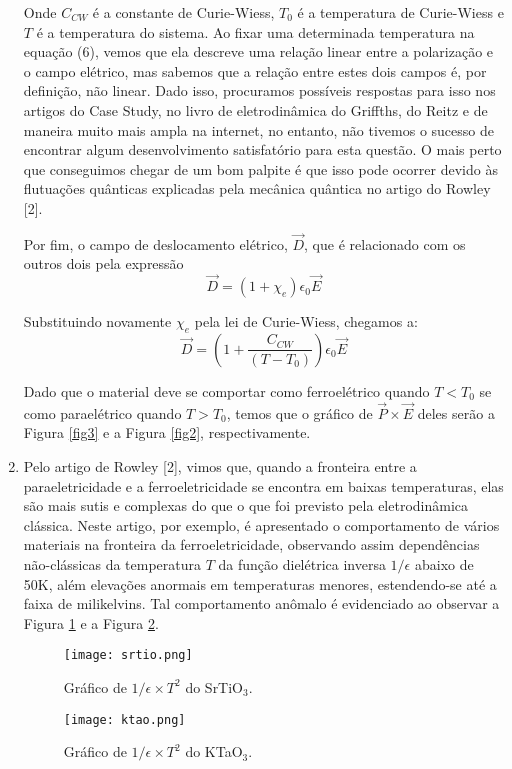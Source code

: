 \documentclass[a4paper,12pt]{article}
\newcommand{\eq}{\begin{equation}}
\newcommand{\feq}{\end{equation}}
\begin{document}
\begin{enumerate}
Onde $C_{CW}$ é a constante de Curie-Wiess, $T_0$ é a temperatura de Curie-Wiess e $T$ é a temperatura do sistema. Ao fixar uma determinada temperatura na equação (6), vemos que ela descreve uma relação linear entre a polarização e o campo elétrico, mas sabemos que a relação entre estes dois campos é, por definição, não linear. Dado isso, procuramos possíveis respostas para isso nos artigos do Case Study, no livro de eletrodinâmica do Griffths, do Reitz e de maneira muito mais ampla na internet, no entanto, não tivemos o sucesso de encontrar algum desenvolvimento satisfatório para esta questão. O mais perto que conseguimos chegar de um bom palpite é que isso pode ocorrer devido às flutuações quânticas explicadas pela mecânica quântica no artigo do Rowley [2].

Por fim, o campo de deslocamento elétrico, $\vec{D}$, que é relacionado com os outros dois pela expressão \eq\vec{D} = \left ( 1+ \chi_e \right ) \epsilon_0 \vec{E}\feq

Substituindo novamente $\chi_e$ pela lei de Curie-Wiess, chegamos a:
\eq\vec{D} = \left ( 1+ \dfrac{C_{CW}}{\left( T-T_0 \right)}\right) \epsilon_0 \vec{E}\feq

Dado que o material deve se comportar como ferroelétrico quando $T<T_0$ se como paraelétrico quando  $T>T_0$, temos que o gráfico de $\vec{P} \times \vec{E}$ deles serão a Figura \ref{fig3} e a Figura \ref{fig2}, respectivamente.

\item Pelo artigo de Rowley [2], vimos que, quando a fronteira entre a paraeletricidade e a ferroeletricidade se encontra em baixas temperaturas, elas são mais sutis e complexas do que o que foi previsto pela eletrodinâmica clássica. Neste artigo, por exemplo, é apresentado o comportamento de vários materiais na fronteira da ferroeletricidade, observando assim dependências não-clássicas da temperatura $T$ da  função dielétrica inversa $1/\epsilon $ abaixo de 50K, além elevações anormais em temperaturas menores, estendendo-se até a faixa de milikelvins. Tal comportamento anômalo é evidenciado ao observar a Figura \ref{fig6} e a Figura \ref{fig7}.

\begin{figure}[H] 
\centering
\texttt{[image: srtio.png]} 
\caption{Gráfico de $1/\epsilon\times T^2$ do SrTiO$_3$.} 
\label{fig6} 
\end{figure}

\begin{figure}[H] 
\centering
\texttt{[image: ktao.png]} 
\caption{Gráfico de $1/\epsilon\times T^2$ do KTaO$_3$.} 
\label{fig7} 
\end{figure}


\end{enumerate}
\end{document}
